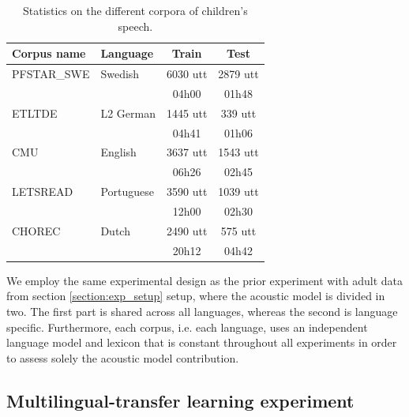 \begin{table}[ht]
\begin{center}
\begin{tabular}{llcc}
\hline
Corpus name & Language     & Train & Test  \\ \hline
\multicolumn{1}{l}{PFSTAR\_SWE} & Swedish             & 6030 utt  & 2879 utt  \\ 
\multicolumn{1}{l}{} &              & 04h00 & 01h48 \\\hline
\multicolumn{1}{l}{ETLTDE}      & L2 German   & 1445 utt &  339 utt \\ 
\multicolumn{1}{l}{}      &    &  04h41 & 01h06 \\ \hline
\multicolumn{1}{l}{CMU}         & English             & 3637 utt & 1543 utt \\ 
\multicolumn{1}{l}{}         &              & 06h26 & 02h45  \\ \hline
\multicolumn{1}{l}{LETSREAD}    & Portuguese & 3590 utt & 1039 utt \\ 
\multicolumn{1}{l}{}    &  & 12h00 & 02h30 \\  \hline
\multicolumn{1}{l}{CHOREC}      & Dutch               & 2490 utt & 575 utt  \\ 
\multicolumn{1}{l}{}      &                &  20h12 & 04h42 \\ \hline
\end{tabular}
\caption{Statistics on the different corpora of children's speech.}
\label{tab:statistics}
\end{center}
\end{table}

We employ the same experimental design as the prior experiment with adult data from section \ref{section:exp_setup} setup, where the acoustic model is divided in two. The first part is shared across all languages, whereas the second is language specific.
Furthermore, each corpus, i.e. each language, uses an independent language model and lexicon that is constant throughout all experiments in order to assess solely the acoustic model contribution.

\subsection{Multilingual-transfer learning experiment}

